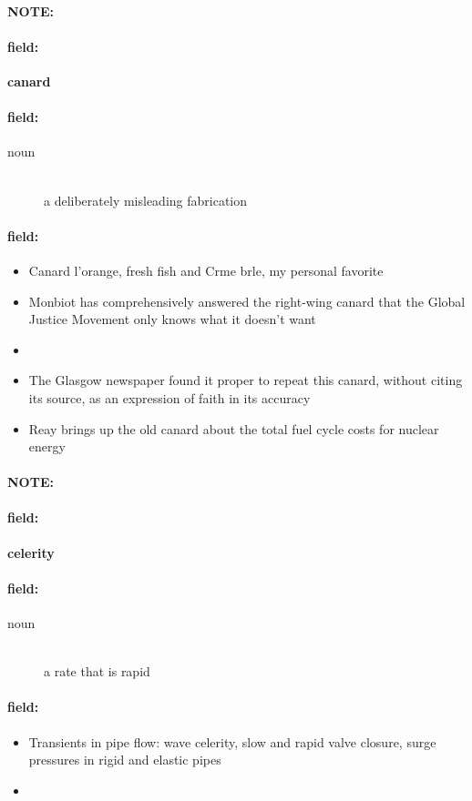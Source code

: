 \documentclass[12pt]{article}
\newenvironment{note}{\paragraph{NOTE:}}{}
\newenvironment{field}{\paragraph{field:}}{}
\begin{document}
\begin{note}
\begin{field}
\textbf{\large canard}
\end{field}


\begin{field}
\begin{description}
\item[noun] \hfill \\ 
a deliberately misleading fabrication

\end{description}
\end{field}

\begin{field}
\begin{itemize}
\item Canard  l'orange, fresh fish and Crme brle, my personal favorite
\item Monbiot has comprehensively answered the right-wing canard that the Global Justice Movement only knows what it doesn't want
\item 
\item The Glasgow newspaper found it proper to repeat this canard, without citing its source, as an expression of faith in its accuracy
\item Reay brings up the old canard about the total fuel cycle costs for nuclear energy
\end{itemize}
\end{field}
\end{note}
\begin{note}
\begin{field}
\textbf{\large celerity}
\end{field}


\begin{field}
\begin{description}
\item[noun] \hfill \\ 
a rate that is rapid

\end{description}
\end{field}

\begin{field}
\begin{itemize}
\item Transients in pipe flow: wave celerity, slow and rapid valve closure, surge pressures in rigid and elastic pipes
\item 
\end{itemize}
\end{field}
\end{note}
\end{document}
